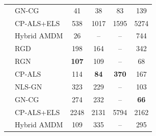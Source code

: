 \begin{table}[!htbp]
{\begin{tabular}{llcccc}
 & GN-CG & 41 & 38 & 83 & 139 \\
 & CP-ALS+ELS & 538 & 1017 & 1595 & 5274 \\
 & Hybrid AMDM & 26 & -- & -- & 744 \\
\addlinespace
3 & RGD & 198 & 164 & -- & 342 \\
 & RGN & \textbf{107} & 109 & -- & 68 \\
 & CP-ALS & 114 & \textbf{84} & \textbf{370} & 167 \\
 & NLS-GN & 323 & 229 & -- & 103 \\
 & GN-CG & 274 & 232 & -- & \textbf{66} \\
 & CP-ALS+ELS & 2248 & 2131 & 5794 & 2162 \\
 & Hybrid AMDM & 109 & 335 & -- & 295 \\
\bottomrule
\end{tabular}}
\end{table}
